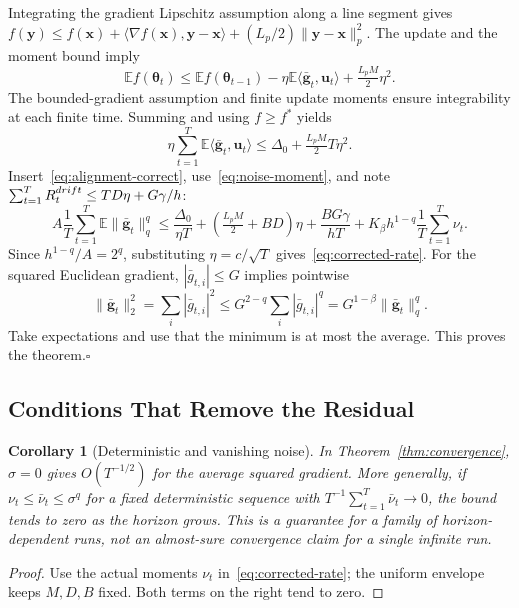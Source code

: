 \documentclass[10pt,a4paper]{amsart}
\newtheorem{corollary}{Corollary}
\begin{document}
Integrating the gradient Lipschitz assumption along a line segment gives
$f(\mathbf{y})\le f(\mathbf{x})+\langle\nabla f(\mathbf{x}),\mathbf{y}-\mathbf{x}\rangle+(L_p/2)\|\mathbf{y}-\mathbf{x}\|_p^2$.
The update and the moment bound imply
\begin{equation}
\mathbb E f(\bm{\theta}_t)\le\mathbb E f(\bm{\theta}_{t-1})
-\eta\mathbb E\langle\bar{\mathbf{g}}_t,\mathbf{u}_t\rangle+\tfrac{L_pM}2\eta^2.
\end{equation}
The bounded-gradient assumption and finite update moments ensure integrability at each finite time. Summing and using $f\ge f^*$ yields
\begin{equation}
\eta\sum_{t=1}^T\mathbb E\langle\bar{\mathbf{g}}_t,\mathbf{u}_t\rangle\le\Delta_0+\tfrac{L_pM}2T\eta^2.
\end{equation}
Insert~\eqref{eq:alignment-correct}, use~\eqref{eq:noise-moment}, and note $\sum_{t=1}^TR_t^{\rm drift}\le TD\eta+G\gamma/h$:
\begin{equation}\label{eq:master-bound}
A\frac1T\sum_{t=1}^T\mathbb E\|\bar{\mathbf{g}}_t\|_q^q
\le\frac{\Delta_0}{\eta T}+\left(\tfrac{L_pM}2+BD\right)\eta
+\frac{BG\gamma}{hT}+K_\beta h^{1-q}\frac1T\sum_{t=1}^T\nu_t.
\end{equation}
Since $h^{1-q}/A=2^q$, substituting $\eta=c/\sqrt T$ gives~\eqref{eq:corrected-rate}. For the squared Euclidean gradient, $|\bar g_{t,i}|\le G$ implies pointwise
\begin{equation}\label{eq:correct-norm-conversion}
\|\bar{\mathbf{g}}_t\|_2^2=\sum_i|\bar g_{t,i}|^2
\le G^{2-q}\sum_i|\bar g_{t,i}|^q=G^{1-\beta}\|\bar{\mathbf{g}}_t\|_q^q.
\end{equation}
Take expectations and use that the minimum is at most the average. This proves the theorem.\hfill$\square$

\subsection{Conditions That Remove the Residual}
\begin{corollary}[Deterministic and vanishing noise]\label{cor:vanishing}
In Theorem~\ref{thm:convergence}, $\sigma=0$ gives $O(T^{-1/2})$ for the average squared gradient. More generally, if $\nu_t\le\bar\nu_t\le\sigma^q$ for a fixed deterministic sequence with $T^{-1}\sum_{t=1}^T\bar\nu_t\to0$, the bound tends to zero as the horizon grows. This is a guarantee for a family of horizon-dependent runs, not an almost-sure convergence claim for a single infinite run.
\end{corollary}
\begin{proof}
Use the actual moments $\nu_t$ in~\eqref{eq:corrected-rate}; the uniform envelope keeps $M,D,B$ fixed. Both terms on the right tend to zero.
\end{proof}
\end{document}
